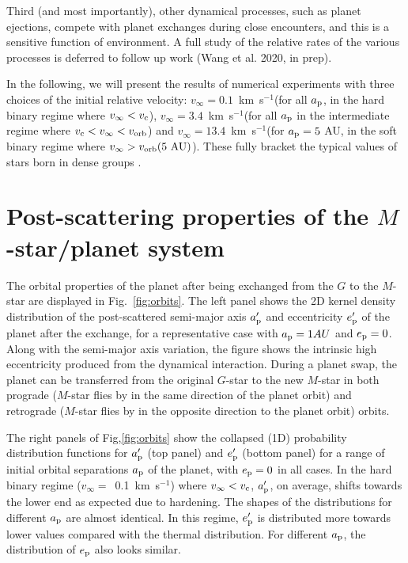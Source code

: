 \documentclass[twocolumn]{aastex62}
\begin{document}
Third (and most importantly), 
other dynamical processes, such as planet ejections, compete with planet exchanges during close encounters, and this is a sensitive function of environment.  
A full study of the relative rates of the various processes is deferred to follow up work (Wang et al. 2020, in prep).

In the following, we will present the results
of numerical experiments with three choices of the initial relative velocity: $v_\infty =0.1$~km~s$^{-1}$(for all $a_{\rm p}$, in the hard binary regime where $v_\infty < v_{\rm c}$),
$v_\infty =3.4$~km~s$^{-1}$(for all $a_{\rm p}$ in the intermediate regime where $v_{\rm c} < v_\infty < v_{\rm orb}$)
and $v_\infty =13.4$~km~s$^{-1}$(for $a_{\rm p}=5$ AU, in the soft binary regime where  $v_\infty > v_{\rm orb}(5~{\rm AU})$).
These fully bracket the typical values
of stars born in dense groups \citep{Binney1987,Adams2001}.





\section{Post-scattering properties of the $M$-star/planet system}

The orbital properties of the planet after being exchanged from the $G$ to the $M$-star are displayed in Fig.~\ref{fig:orbits}. The left panel shows the 2D kernel density distribution of the post-scattered semi-major axis $a_{\rm p}^\prime$ and eccentricity $e_{\rm p}^\prime$ of the  planet after the exchange, for a representative case with $a_{\rm p}=1AU$ and $e_{\rm p}=0$. 
Along with the semi-major axis variation, 
the figure shows the
intrinsic high eccentricity produced from the dynamical interaction. During a planet swap, the planet can be transferred from the original $G$-star to the new $M$-star in both prograde ($M$-star flies by in the same direction of the planet orbit) and retrograde ($M$-star flies by in the opposite direction to the planet orbit) orbits. 

The right panels of Fig,\ref{fig:orbits} show the collapsed (1D) probability distribution functions for $a_{\rm p}^\prime$ (top panel) 
and $e_{\rm p}^\prime$ (bottom panel) for a range of initial orbital separations $a_{\rm p}$ of the planet, with $e_{\rm p}=0$ in all cases. 
 In the hard binary regime ($v_\infty=$~0.1~km~s$^{-1}$) where $v_\infty < v_{\rm c}$,  $a_{\rm p}^\prime$, on average, shifts towards the lower end as expected due to hardening. The shapes of the distributions for different $a_{\rm p}$ are almost identical.  In this regime, $e_{\rm p}^\prime$ is distributed more towards lower values compared with the thermal distribution. For different $a_{\rm p}$, the distribution of $e_{\rm p}$ also looks similar.
\end{document}
